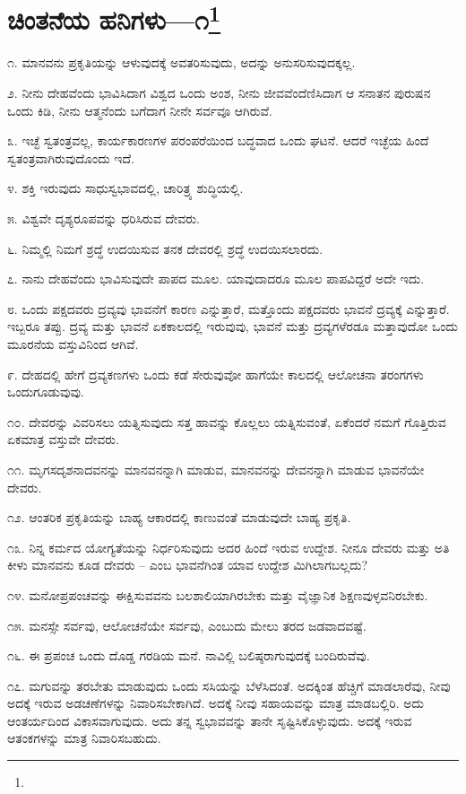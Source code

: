\newpage

\chapter[ಚಿಂತನೆಯ ಹನಿಗಳು—೧]{ಚಿಂತನೆಯ ಹನಿಗಳು—೧\protect\footnote{}}

೧. ಮಾನವನು ಪ್ರಕೃತಿಯನ್ನು ಆಳುವುದಕ್ಕೆ ಅವತರಿಸುವುದು, ಅದನ್ನು ಅನುಸರಿಸುವುದಕ್ಕಲ್ಲ.

೨. ನೀನು ದೇಹವೆಂದು ಭಾವಿಸಿದಾಗ ವಿಶ್ವದ ಒಂದು ಅಂಶ, ನೀನು ಜೀವವೆಂದೆಣಿಸಿದಾಗ ಆ ಸನಾತನ ಪುರುಷನ ಒಂದು ಕಿಡಿ, ನೀನು ಆತ್ಮನೆಂದು ಬಗೆದಾಗ ನೀನೇ ಸರ್ವವೂ ಆಗಿರುವೆ.

೩. ಇಚ್ಛೆ ಸ್ವತಂತ್ರವಲ್ಲ, ಕಾರ್ಯಕಾರಣಗಳ ಪರಂಪರೆಯಿಂದ ಬದ್ಧವಾದ ಒಂದು ಘಟನೆ. ಆದರೆ ಇಚ್ಛೆಯ ಹಿಂದೆ ಸ್ವತಂತ್ರವಾಗಿರುವುದೊಂದು ಇದೆ.

೪. ಶಕ್ತಿ ಇರುವುದು ಸಾಧುಸ್ವಭಾವದಲ್ಲಿ, ಚಾರಿತ್ರ್ಯ ಶುದ್ಧಿಯಲ್ಲಿ.

೫. ವಿಶ್ವವೇ ದೃಶ್ಯರೂಪವನ್ನು ಧರಿಸಿರುವ ದೇವರು.

೬. ನಿಮ್ಮಲ್ಲಿ ನಿಮಗೆ ಶ್ರದ್ಧೆ ಉದಯಿಸುವ ತನಕ ದೇವರಲ್ಲಿ ಶ್ರದ್ಧೆ ಉದಯಿಸಲಾರದು.

೭. ನಾನು ದೇಹವೆಂದು ಭಾವಿಸುವುದೇ ಪಾಪದ ಮೂಲ. ಯಾವುದಾದರೂ ಮೂಲ ಪಾಪವಿದ್ದರೆ ಅದೇ ಇದು.

೮. ಒಂದು ಪಕ್ಷದವರು ದ್ರವ್ಯವು  ಭಾವನೆಗೆ  ಕಾರಣ ಎನ್ನುತ್ತಾರೆ, ಮತ್ತೊಂದು ಪಕ್ಷದವರು ಭಾವನೆ ದ್ರವ್ಯಕ್ಕೆ ಎನ್ನುತ್ತಾರೆ. ಇಬ್ಬರೂ ತಪ್ಪು. ದ್ರವ್ಯ ಮತ್ತು ಭಾವನೆ ಏಕಕಾಲದಲ್ಲಿ ಇರುವುವು, ಭಾವನೆ ಮತ್ತು ದ್ರವ್ಯಗಳೆರಡೂ ಮತ್ತಾವುದೋ ಒಂದು ಮೂರನೆಯ ವಸ್ತುವಿನಿಂದ ಆಗಿವೆ.

೯. ದೇಹದಲ್ಲಿ ಹೇಗೆ ದ್ರವ್ಯಕಣಗಳು ಒಂದು ಕಡೆ ಸೇರುವುವೋ ಹಾಗೆಯೇ ಕಾಲದಲ್ಲಿ ಆಲೋಚನಾ ತರಂಗಗಳು ಒಂದುಗೂಡುವುವು.

೧೦. ದೇವರನ್ನು ವಿವರಿಸಲು ಯತ್ನಿಸುವುದು ಸತ್ತ ಹಾವನ್ನು ಕೊಲ್ಲಲು ಯತ್ನಿಸುವಂತೆ, ಏಕೆಂದರೆ ನಮಗೆ ಗೊತ್ತಿರುವ ಏಕಮಾತ್ರ ವಸ್ತುವೇ ದೇವರು.

೧೧. ಮೃಗಸದೃಶನಾದವನನ್ನು ಮಾನವನನ್ನಾಗಿ ಮಾಡುವ, ಮಾನವನನ್ನು ದೇವನನ್ನಾಗಿ ಮಾಡುವ ಭಾವನೆಯೇ ದೇವರು.

೧೨. ಆಂತರಿಕ ಪ್ರಕೃತಿಯನ್ನು ಬಾಹ್ಯ ಆಕಾರದಲ್ಲಿ ಕಾಣುವಂತೆ ಮಾಡುವುದೇ ಬಾಹ್ಯ ಪ್ರಕೃತಿ.

೧೩. ನಿನ್ನ ಕರ್ಮದ ಯೋಗ್ಯತೆಯನ್ನು ನಿರ್ಧರಿಸುವುದು ಅದರ ಹಿಂದೆ ಇರುವ ಉದ್ದೇಶ. ನೀನೂ ದೇವರು ಮತ್ತು ಅತಿ ಕೀಳು ಮಾನವನು ಕೂಡ ದೇವರು – ಎಂಬ ಭಾವನೆಗಿಂತ ಯಾವ ಉದ್ದೇಶ ಮಿಗಿಲಾಗಬಲ್ಲದು?

೧೪. ಮನೋಪ್ರಪಂಚವನ್ನು ಈಕ್ಷಿಸುವವನು ಬಲಶಾಲಿಯಾಗಿರಬೇಕು ಮತ್ತು ವೈಜ್ಞಾನಿಕ ಶಿಕ್ಷಣವುಳ್ಳವನಿರಬೇಕು.

೧೫. ಮನಸ್ಸೇ ಸರ್ವವು, ಆಲೋಚನೆಯೇ ಸರ್ವವು, ಎಂಬುದು ಮೇಲು ತರದ ಜಡವಾದವಷ್ಟೆ.

೧೬. ಈ ಪ್ರಪಂಚ ಒಂದು ದೊಡ್ಡ ಗರಡಿಯ ಮನೆ. ನಾವಿಲ್ಲಿ ಬಲಿಷ್ಠರಾಗುವುದಕ್ಕೆ ಬಂದಿರುವೆವು.

೧೭. ಮಗುವನ್ನು ತರಬೇತು ಮಾಡುವುದು ಒಂದು ಸಸಿಯನ್ನು ಬೆಳೆಸಿದಂತೆ. ಅದಕ್ಕಿಂತ ಹೆಚ್ಚಿಗೆ ಮಾಡಲಾರೆವು, ನೀವು ಅದಕ್ಕೆ ಇರುವ ಅಡಚಣೆಗಳನ್ನು ನಿವಾರಿಸಬೇಕಾಗಿದೆ. ಅದಕ್ಕೆ ನೀವು ಸಹಾಯವನ್ನು ಮಾತ್ರ ಮಾಡಬಲ್ಲಿರಿ. ಅದು ಆಂತರ್ಯದಿಂದ ವಿಕಾಸವಾಗುವುದು. ಅದು ತನ್ನ ಸ್ವಭಾವವನ್ನು ತಾನೇ ಸೃಷ್ಟಿಸಿಕೊಳ್ಳುವುದು. ಅದಕ್ಕೆ ಇರುವ ಆತಂಕಗಳನ್ನು ಮಾತ್ರ ನಿವಾರಿಸಬಹುದು.

